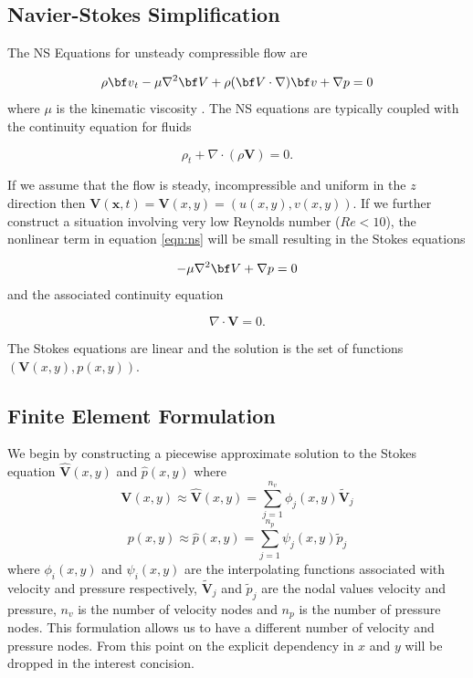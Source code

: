 \documentclass[wrr]{agutex}  %
\begin{document}
\begin{article}
\subsection{Navier-Stokes Simplification}
The NS Equations for unsteady compressible flow are 

\begin{equation}
  \rho {\bf v}_t - \mu \nabla^2 {\bf V} + \rho ({\bf V}  \cdot \nabla ) {\bf v} 
    + \nabla p = 0 \label{eqn:ns}
\end{equation}
where $\mu$ is the kinematic viscosity \citep{Chung2002}.  The NS equations are typically coupled with the continuity equation for fluids

\begin{equation}
\rho_t + \nabla \cdot (\rho \mathbf{V}) = 0.
\end{equation}

If we assume that the flow is steady, incompressible and uniform in the $z$ direction then $\mathbf{V}(\mathbf{x},t) = \mathbf{V}(x,y) = (u(x,y),v(x,y))$.  If we further construct a situation involving very low Reynolds number ($Re<10$), the nonlinear term in equation \ref{eqn:ns} will be small resulting in the Stokes equations 

\begin{equation}
  - \mu \nabla^2 {\bf V} + \nabla p = 0 \label{eqn:momentum}
\end{equation}
and the associated continuity equation

\begin{equation}
\nabla \cdot \mathbf{V} = 0. \label{eqn:continuity}
\end{equation}

The Stokes equations are linear and the solution is the set of functions $({\mathbf V}(x,y), p(x,y))$.

\subsection{Finite Element Formulation}\label{sec:fe_devel}
We begin by constructing a piecewise approximate solution to the Stokes equation $\hat{\mathbf{V}}(x,y)$ and $\hat{p}(x,y)$ where 
\begin{equation}
\mathbf{V}(x,y)\approx\hat{\mathbf{V}}(x,y)=\sum_{j=1}^{n_v}\phi_j(x,y)\tilde{\mathbf{V}}_j
\end{equation}
\begin{equation}
p(x,y)\approx\hat{p}(x,y)=\sum_{j=1}^{n_p}\psi_j(x,y)\tilde{p}_j
\end{equation}
where $\phi_i(x,y)$ and $\psi_i(x,y)$ are the interpolating functions associated with velocity and pressure respectively, $\tilde{\mathbf{V}}_j$ and $\tilde{p}_j$ are the nodal values velocity and pressure, $n_v$ is the number of velocity nodes and $n_p$ is the number of pressure nodes.  This formulation allows us to have a different number of velocity and pressure nodes.  From this point on the explicit dependency in $x$ and $y$ will be dropped in the interest concision.  


\end{article}
\end{document}
